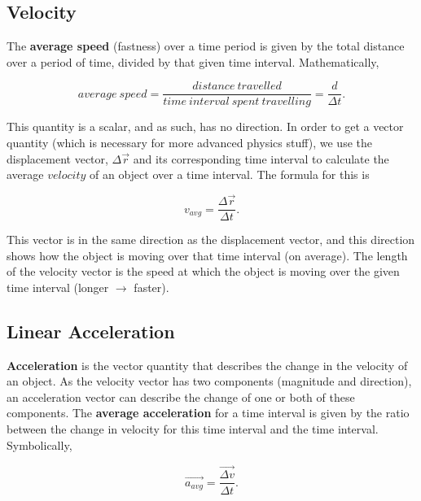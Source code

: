 \documentclass[12pt,letterpaper]{article}
\begin{document}
\subsection[Velocity]{Velocity}

The \textbf{average speed} (fastness) over a time period is given by the total distance over a period of time, divided by that given time interval. Mathematically, 

\begin{center}
$$average\ speed=\frac{distance\ travelled}{time\ interval\ spent\ travelling}=\frac{d}{\Delta t}.$$\linebreak
\end{center}

This quantity is a scalar, and as such, has no direction. In order to get a vector quantity (which is necessary for more advanced physics stuff), we use the displacement vector, $\Delta\vec{r}$ and its corresponding time interval to calculate the average $velocity$ of an object over a time interval. The formula for this is

\begin{center}
$$v_{avg}=\frac{\Delta\vec{r}}{\Delta t}.$$\linebreak
\end{center}

This vector is in the same direction as the displacement vector, and this direction shows how the object is moving over that time interval (on average). The length of the velocity vector is the speed at which the object is moving over the given time interval (longer $\rightarrow$ faster).

\subsection[Linear Acceleration]{Linear Acceleration}

\textbf{Acceleration} is the vector quantity that describes the change in the velocity of an object. As the velocity vector has two components (magnitude and direction), an acceleration vector can describe the change of one or both of these components. The \textbf{average acceleration} for a time interval is given by the ratio between the change in velocity for this time interval and the time interval. Symbolically,

\begin{center}
$$\vec{a_{avg}}=\frac{\vec{\Delta v}}{\Delta t}.$$\linebreak
\end{center}
\end{document}
